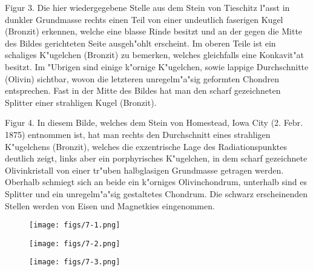 \documentclass[a4paper, 11pt, oneside, polutonikogreek, german]{article}
\begin{document}
Figur 3. Die hier wiedergegebene Stelle aus dem Stein von Tieschitz l"asst in dunkler Grundmasse rechts einen Teil von einer undeutlich faserigen Kugel (Bronzit) erkennen, welche eine blasse Rinde besitzt und an der gegen die Mitte des Bildes gerichteten Seite ausgeh"ohlt erscheint. Im oberen Teile ist ein schaliges K"ugelchen (Bronzit) zu bemerken, welches gleichfalls eine Konkavit"at besitzt. Im "Ubrigen sind einige k"ornige K"ugelchen, sowie lappige Durchschnitte (Olivin) sichtbar, wovon die letzteren unregelm"a"sig geformten Chondren entsprechen. Fast in der Mitte des Bildes hat man den scharf gezeichneten Splitter einer strahligen Kugel (Bronzit).

Figur 4. In diesem Bilde, welches dem Stein von Homestead, Iowa City (2. Febr. 1875) entnommen ist, hat man rechts den Durchschnitt eines strahligen K"ugelchens (Bronzit), welches die exzentrische Lage des Radiationspunktes deutlich zeigt, links aber ein porphyrisches K"ugelchen, in dem scharf gezeichnete Olivinkristall von einer tr"uben halbglasigen Grundmasse getragen werden. Oberhalb schmiegt sich an beide ein k"orniges Olivinchondrum, unterhalb sind es Splitter und ein unregelm"a"sig gestaltetes Chondrum. Die schwarz erscheinenden Stellen werden von Eisen und Magnetkies eingenommen.
\clearpage

\vspace*{\fill}
\begin{figure}[H]
\centering
\texttt{[image: figs/7-1.png]}
\caption{}
\end{figure}
\vspace*{\fill}
\clearpage

\vspace*{\fill}
\begin{figure}[H]
\centering
\texttt{[image: figs/7-2.png]}
\caption{}
\end{figure}
\vspace*{\fill}
\clearpage

\vspace*{\fill}
\begin{figure}[H]
\centering
\texttt{[image: figs/7-3.png]}
\caption{}
\end{figure}
\vspace*{\fill}
\clearpage
\end{document}
